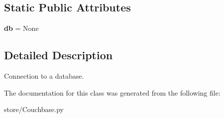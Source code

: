 \subsection*{Static Public Attributes}
\begin{DoxyCompactItemize}
\item 
\hypertarget{classstore_1_1_couchbase_1_1_couchbase_store_ab093dc34e30c763de3c482f5c5d01da8}{{\bfseries db} = None}\label{classstore_1_1_couchbase_1_1_couchbase_store_ab093dc34e30c763de3c482f5c5d01da8}

\end{DoxyCompactItemize}


\subsection{Detailed Description}
Connection to a database. 

The documentation for this class was generated from the following file\-:\begin{DoxyCompactItemize}
\item 
store/Couchbase.\-py\end{DoxyCompactItemize}
